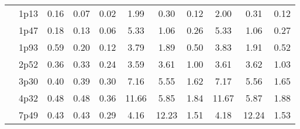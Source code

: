 \documentclass[12pt,A4paper]{article}
\begin{document}
\begin{table}[]
\begin{tabular}{lllllllllll}
\multicolumn{1}{|l|}{} & \multicolumn{1}{l|}{1p13} & \multicolumn{1}{c|}{0.16}        & \multicolumn{1}{c|}{0.07}         & \multicolumn{1}{c|}{0.02}        & \multicolumn{1}{c|}{1.99}         & \multicolumn{1}{c|}{0.30}        & \multicolumn{1}{c|}{0.12}        & \multicolumn{1}{c|}{2.00}        & \multicolumn{1}{c|}{0.31}        & \multicolumn{1}{c|}{0.12}         \\ \cline{2-11}
\multicolumn{1}{|l|}{} & \multicolumn{1}{l|}{1p47} & \multicolumn{1}{c|}{0.18}        & \multicolumn{1}{c|}{0.13}         & \multicolumn{1}{c|}{0.06}        & \multicolumn{1}{c|}{5.33}         & \multicolumn{1}{c|}{1.06}        & \multicolumn{1}{c|}{0.26}        & \multicolumn{1}{c|}{5.33}        & \multicolumn{1}{c|}{1.06}        & \multicolumn{1}{c|}{0.27}         \\ \cline{2-11}
\multicolumn{1}{|l|}{} & \multicolumn{1}{l|}{1p93} & \multicolumn{1}{c|}{0.59}        & \multicolumn{1}{c|}{0.20}         & \multicolumn{1}{c|}{0.12}        & \multicolumn{1}{c|}{3.79}         & \multicolumn{1}{c|}{1.89}        & \multicolumn{1}{c|}{0.50}        & \multicolumn{1}{c|}{3.83}        & \multicolumn{1}{c|}{1.91}        & \multicolumn{1}{c|}{0.52}         \\ \cline{2-11}
\multicolumn{1}{|l|}{} & \multicolumn{1}{l|}{2p52} & \multicolumn{1}{c|}{0.36}        & \multicolumn{1}{c|}{0.33}         & \multicolumn{1}{c|}{0.24}        & \multicolumn{1}{c|}{3.59}         & \multicolumn{1}{c|}{3.61}        & \multicolumn{1}{c|}{1.00}        & \multicolumn{1}{c|}{3.61}        & \multicolumn{1}{c|}{3.62}        & \multicolumn{1}{c|}{1.03}         \\ \cline{2-11}
\multicolumn{1}{|l|}{} & \multicolumn{1}{l|}{3p30} & \multicolumn{1}{c|}{0.40}        & \multicolumn{1}{c|}{0.39}         & \multicolumn{1}{c|}{0.30}        & \multicolumn{1}{c|}{7.16}         & \multicolumn{1}{c|}{5.55}        & \multicolumn{1}{c|}{1.62}        & \multicolumn{1}{c|}{7.17}        & \multicolumn{1}{c|}{5.56}        & \multicolumn{1}{c|}{1.65}         \\ \cline{2-11}
\multicolumn{1}{|l|}{} & \multicolumn{1}{l|}{4p32} & \multicolumn{1}{c|}{0.48}        & \multicolumn{1}{c|}{0.48}         & \multicolumn{1}{c|}{0.36}        & \multicolumn{1}{c|}{11.66}         & \multicolumn{1}{c|}{5.85}        & \multicolumn{1}{c|}{1.84}        & \multicolumn{1}{c|}{11.67}        & \multicolumn{1}{c|}{5.87}        & \multicolumn{1}{c|}{1.88}         \\ \cline{2-11}
\multicolumn{1}{|l|}{} & \multicolumn{1}{l|}{7p49} & \multicolumn{1}{c|}{0.43}        & \multicolumn{1}{c|}{0.43}         & \multicolumn{1}{c|}{0.29}        & \multicolumn{1}{c|}{4.16}         & \multicolumn{1}{c|}{12.23}        & \multicolumn{1}{c|}{1.51}        & \multicolumn{1}{c|}{4.18}        & \multicolumn{1}{c|}{12.24}        & \multicolumn{1}{c|}{1.53}         \\ \cline{2-11}

\end{tabular}
\end{table}
\end{document}
